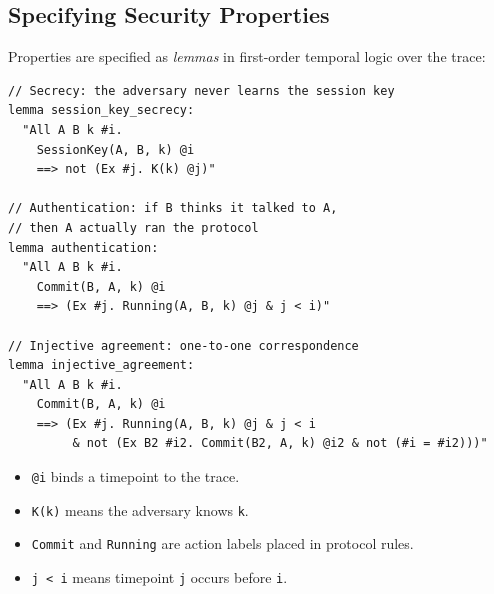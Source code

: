 \subsection{Specifying Security Properties}

Properties are specified as \emph{lemmas} in first-order temporal logic over the trace:

\begin{lstlisting}[language=Tamarin,caption={Security property specification}]
// Secrecy: the adversary never learns the session key
lemma session_key_secrecy:
  "All A B k #i.
    SessionKey(A, B, k) @i
    ==> not (Ex #j. K(k) @j)"

// Authentication: if B thinks it talked to A,
// then A actually ran the protocol
lemma authentication:
  "All A B k #i.
    Commit(B, A, k) @i
    ==> (Ex #j. Running(A, B, k) @j & j < i)"

// Injective agreement: one-to-one correspondence
lemma injective_agreement:
  "All A B k #i.
    Commit(B, A, k) @i
    ==> (Ex #j. Running(A, B, k) @j & j < i
         & not (Ex B2 #i2. Commit(B2, A, k) @i2 & not (#i = #i2)))"
\end{lstlisting}

\begin{itemize}[nosep]
  \item \texttt{@i} binds a timepoint to the trace.
  \item \texttt{K(k)} means the adversary knows \texttt{k}.
  \item \texttt{Commit} and \texttt{Running} are action labels placed in protocol rules.
  \item \texttt{j < i} means timepoint \texttt{j} occurs before \texttt{i}.
\end{itemize}


